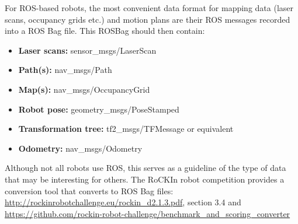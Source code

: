     For ROS-based robots, the most convenient data format for mapping data (laser scans, occupancy grids etc.) and motion plans are their ROS messages recorded into a ROS Bag file.
    This ROSBag should then contain:
     \begin{itemize}
       \item \textbf{Laser scans: } sensor\_msgs/LaserScan
       \item \textbf{Path(s): } nav\_msgs/Path
       \item \textbf{Map(s): } nav\_msgs/OccupancyGrid
       \item \textbf{Robot pose: } geometry\_msgs/PoseStamped
       \item \textbf{Transformation tree: } tf2\_msgs/TFMessage or equivalent
       \item \textbf{Odometry: } nav\_msgs/Odometry
      \end{itemize}
    Although not all robots use ROS, this serves as a guideline of the type of data that may be interesting for others. 
    The RoCKIn robot competition provides a conversion tool that converts to ROS Bag files:
    \url{http://rockinrobotchallenge.eu/rockin_d2.1.3.pdf}, section 3.4 and 
    \url{https://github.com/rockin-robot-challenge/benchmark_and_scoring_converter}

